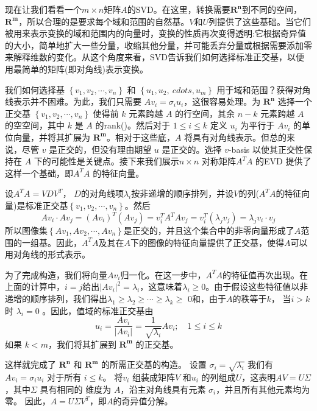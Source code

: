 \documentclass[11pt,a4paper,twoside]{article}
\begin{document}
\begin{CJK}{UTF8}{gbsn}
现在让我们看看一个$m \times n$矩阵$A$的SVD。在这里，转换需要$\mathbf{R}^{\mathbf{n}}$到不同的空间，$\mathbf{R}^{\mathbf{m}}$，所以合理的是要求每个域和范围的自然基。$V$和$U$列提供了这些基础。当它们被用来表示变换的域和范围内的向量时，变换的性质再次变得透明:它根据奇异值的大小，简单地扩大一些分量，收缩其他分量，并可能丢弃分量或根据需要添加零来解释维数的变化。从这个角度来看，SVD告诉我们如何选择标准正交基，以便用最简单的矩阵(即对角线)表示变换。

我们如何选择基 $\left\{v_{1}, v_{2}, \cdots, v_{n}\right\}$ 和 $\left\{u_{1}, u_{2}, \ cdots, u_{m}\right\}$ 用于域和范围？获得对角线表示并不困难。为此，我们只需要 $A v_{i}=\sigma_{i} u_{i}$，这很容易处理。为 $\mathbf{R}^{\mathbf{n}}$ 选择一个正交基 $\left\{v_{1}, v_{2}, \cdots, v_{n}\right\}$ 使得前 $k$ 元素跨越 $A$ 的行空间，其余 $n-k$ 元素跨越 $A$ 的空空间，其中 $k$ 是 $A$ 的rank()。然后对于 $1 \leq i \leq k$ 定义 $u_{i}$ 为平行于 $A v_{i}$ 的单位向量，并将其扩展为 $\mathbf{R}^{\mathbf{ m}}$。相对于这些底，$A$ 将具有对角线表示。但总的来说，尽管 $v$ 是正交的，但没有理由期望 $u$ 是正交的。选择 $v$-basis 以使其正交性保持在 $A$ 下的可能性是关键点。接下来我们展示$n \times n$ 对称矩阵$A^{T} A$ 的EVD 提供了这样一个基础，即$A^{T} A$ 的特征向量。

设$A^{T} A=V D V^{T}$， $D$的对角线项$\lambda_{i}$按非递增的顺序排列，并设$V$的列($A^{T} A$的特征向量)是标准正交基$\left\{v_{1},v_{2}, \cdots, v_{n}\right\}$。然后
$$
A v_{i} \cdot A v_{j}=\left(A v_{i}\right)^{T}\left(A v_{j}\right)=v_{i}^{T} A^{T} A v_{j}=v_{i}^{T}\left(\lambda_{j} v_{j}\right)=\lambda_{j} v_{i} \cdot v_{j}
$$
所以图像集$\left\{A v_{1}, A v_{2}, \cdots, A v_{n}\right\}$是正交的，并且这个集合中的非零向量形成了$A$范围的一组基。因此，$A^{T} A$及其在$A$下的图像的特征向量提供了正交基，使得$A$可以用对角线的形式表示。

为了完成构造，我们将向量$A v_{i}$归一化。在这一步中，$A^{T} A$的特征值再次出现。在上面的计算中，$i=j$给出$\left|A v_{i}\right|^{2}=\lambda_{i}$，这意味着$\lambda_{i} \geq 0$。由于假设这些特征值以非递增的顺序排列，我们得出$\lambda_{1} \geq \lambda_{2} \geq \cdots \geq \lambda_{k} \geq$ 0和，由于$A$的秩等于$k$， 当$i>k$时 $\lambda_{i}=0$ 。因此，值域的标准正交基由
$$
u_{i}=\frac{A v_{i}}{\left|A v_{i}\right|}=\frac{1}{\sqrt{\lambda_{i}}} A v_{i} ; \quad 1 \leq i \leq k
$$
如果 $k<m$，我们将其扩展到 $\mathbf{R}^{\mathbf{m}}$ 的正交基。

这样就完成了 $\mathbf{R}^{\mathbf{n}}$ 和 $\mathbf{R}^\mathbf{m}$ 的所需正交基的构造。 设置 $\sigma_{i}=\sqrt{\lambda_{i}}$ 我们有 $A v_{i}=\sigma_{i} u_{i}$ 对于所有 $i \leq k$。 将$v_{i}$ 组装成矩阵$V$ 和$u_{i}$ 的列组成$U$，这表明$A V=U \Sigma$，其中$\Sigma$ 具有相同的 维度为 $A$，沿主对角线具有元素 $\sigma_{i}$，并且所有其他元素均为零。 因此，$A=U \Sigma V^{T}$，即$A$的奇异值分解。


\end{CJK}
\end{document}
